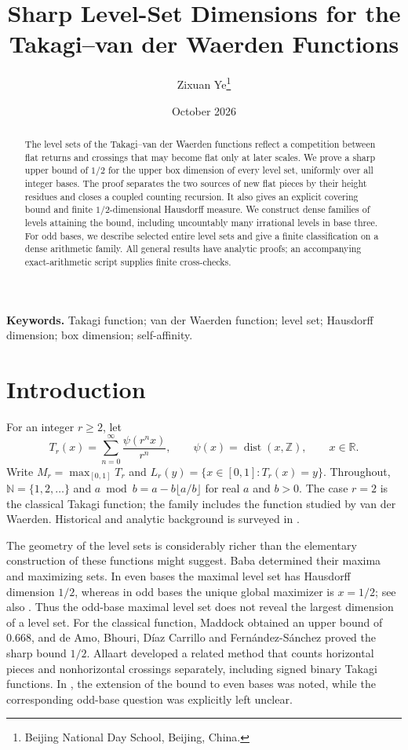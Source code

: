 \documentclass[11pt]{article}
\title{\textbf{Sharp Level-Set Dimensions for the\\Takagi--van der Waerden Functions}}
\author{Zixuan Ye\thanks{Beijing National Day School, Beijing, China.}}
\date{October 2026}
\theoremstyle{definition}
\theoremstyle{remark}
\newcommand{\R}{\mathbb R}
\newcommand{\Z}{\mathbb Z}
\newcommand{\N}{\mathbb N}
\newcommand{\dist}{\operatorname{dist}}
\begin{document}
\maketitle
\begin{abstract}
The level sets of the Takagi--van der Waerden functions reflect a competition
between flat returns and crossings that may become flat only at later scales.
We prove a sharp upper bound of $1/2$ for the upper box dimension of every
level set, uniformly over all integer bases. The proof separates the two
sources of new flat pieces by their height residues and closes a coupled
counting recursion. It also gives an explicit covering bound and finite
$1/2$-dimensional Hausdorff measure. We construct dense families of levels
attaining the bound, including uncountably many irrational levels in base
three. For odd bases, we describe selected entire level sets and give a finite
classification on a dense arithmetic family. All general results have
analytic proofs; an accompanying exact-arithmetic script supplies finite
cross-checks.
\end{abstract}
\noindent\textbf{Keywords.} Takagi function; van der Waerden function; level
set; Hausdorff dimension; box dimension; self-affinity.
\section{Introduction}
For an integer $r\ge2$, let
\begin{equation}\label{eq:defT}
 T_r(x)=\sum_{n=0}^{\infty}\frac{\psi(r^nx)}{r^n},
 \qquad \psi(x)=\dist(x,\Z),\qquad x\in\R.
\end{equation}
Write $M_r=\max_{[0,1]}T_r$ and
$L_r(y)=\{x\in[0,1]:T_r(x)=y\}$.
Throughout, $\N=\{1,2,\ldots\}$ and
$a\bmod b=a-b\lfloor a/b\rfloor$ for real $a$ and $b>0$.
The case $r=2$ is the classical Takagi function; the family includes the
function studied by van der Waerden. Historical and analytic background is
surveyed in \cite{survey}.

The geometry of the level sets is considerably richer than the elementary
construction of these functions might suggest. Baba \cite{baba} determined
their maxima and maximizing sets. In even bases the maximal level set has
Hausdorff dimension $1/2$, whereas in odd bases the unique global maximizer
is $x=1/2$; see also \cite{allaartlevels}. Thus the odd-base maximal level
set does not reveal the largest dimension of a level set.
For the classical function, Maddock \cite{maddock} obtained an upper bound
of $0.668$, and de Amo, Bhouri, D\'iaz Carrillo and Fern\'andez-S\'anchez
\cite{deamo} proved the sharp bound $1/2$.
Allaart \cite{allaartdimension} developed a related method that counts
horizontal pieces and nonhorizontal crossings separately, including signed
binary Takagi functions. In \cite[Introduction]{allaartlevels}, the extension of
the bound to even bases was noted, while the corresponding odd-base
question was explicitly left unclear.
\end{document}
